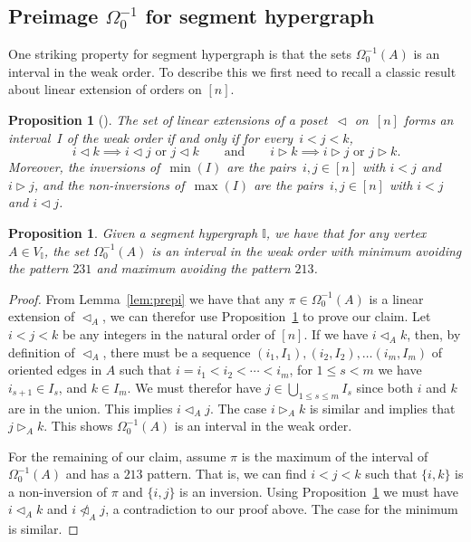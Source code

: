 \documentclass[reqno]{amsart}
\newtheorem{proposition}[theorem]{Proposition}
\theoremstyle{definition}
\newcommand{\less}{\vartriangleleft} %
\newcommand{\more}{\vartriangleright} %
\newcommand{\II}{\mathbb I} %
\begin{document}
\subsection{Preimage $\Omega_0^{-1}$ for segment hypergraph} 
\label{subsec:preimageI}
One striking property for segment hypergraph is that  the sets  $\Omega_0^{-1}(A)$ is an interval in the weak order.
To describe this we first need to recall a classic result about linear extension of orders on $[n]$.

\begin{proposition}[{\cite[Thm.~6.8]{BjornerWachs}}]
\label{prop:WOIP}
The set of linear extensions of a poset~$\less$ on~$[n]$ forms an interval~$I$ of the weak order if and only if for every~$i < j < k$,
\[
i \less k \implies i \less j \text{ or } j \less k
\qquad\text{and}\qquad
i \more k \implies i \more j \text{ or } j \more k.
\]
Moreover, the inversions of~$\min(I)$ are the pairs~$i,j \in [n]$ with $i < j$ and $i \more j$, and the non-inversions of~$\max(I)$ are the pairs~$i,j \in [n]$ with $i < j$ and $i \less j$.
\end{proposition}


\begin{proposition}\label{prop:preimage}
 Given a segment hypergraph $\II$, we have that for any vertex $A\in V_{\II}$, the set $\Omega_0^{-1}(A)$ is an interval 
 in the weak order with minimum avoiding the pattern $231$ and maximum avoiding the pattern $213$.
\end{proposition}

\begin{proof}
From Lemma~\ref{lem:prepi} we have that any $\pi\in \Omega_0^{-1}(A)$  is a linear extension of $\less_A$, we can therefor use Proposition~\ref{prop:WOIP} to prove our claim. 
Let $i<j<k$ be any integers in the natural order of $[n]$. If we have $i\less_{A} k$, then, by definition of $\less_A$, there must be a sequence $(i_1,I_{1}), (i_2,I_{2}),\ldots (i_m,I_{m})$ of oriented edges in $A$ such that
$i=i_1<i_2<\cdots <i_{m}$, for $1\le s<m$ we have $i_{s+1}\in I_s$, and $k\in I_m$. We must therefor have $j\in\bigcup_{1\le s\le m} I_s$ since both $i$ and $k$ are in the union. This implies $i\less_{A} j$. The case $i\more_{A} k$ is similar and  implies
that $j\more_A k$. This shows $\Omega_0^{-1}(A)$ is an interval in the weak order.

For the remaining of our claim, assume $\pi$ is the maximum of the interval of $\Omega_0^{-1}(A)$ and has a $213$ pattern. That is,  we can find $i<j<k$ such that $\{i,k\}$ is a non-inversion of $\pi$ and $\{i,j\}$ is an inversion. Using Proposition~\ref{prop:WOIP} we must have $i\less_A k$ and $i\not\less_A j$, a contradiction to our proof above. The case for the minimum is similar.
\end{proof}
\end{document}
